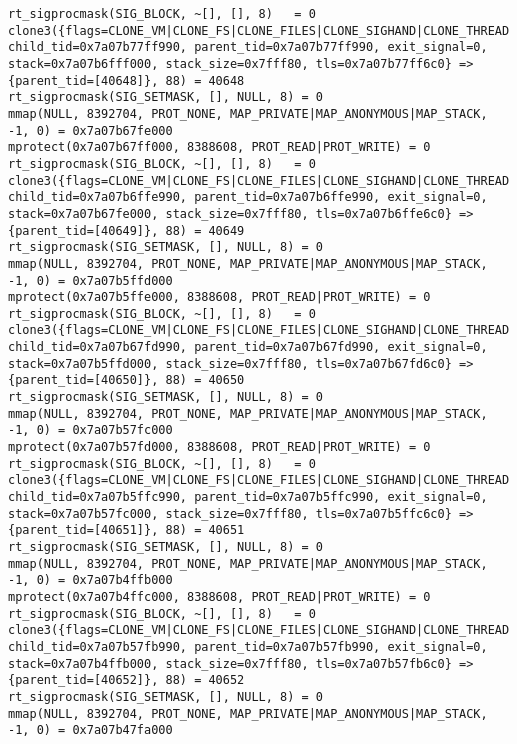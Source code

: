 \begin{verbatim}
rt_sigprocmask(SIG_BLOCK, ~[], [], 8)   = 0
clone3({flags=CLONE_VM|CLONE_FS|CLONE_FILES|CLONE_SIGHAND|CLONE_THREAD|CLONE_SYSVSEM|CLONE_SETTLS|CLONE_PARENT_SETTID|CLONE_CHILD_CLEARTID, child_tid=0x7a07b77ff990, parent_tid=0x7a07b77ff990, exit_signal=0, stack=0x7a07b6fff000, stack_size=0x7fff80, tls=0x7a07b77ff6c0} => {parent_tid=[40648]}, 88) = 40648
rt_sigprocmask(SIG_SETMASK, [], NULL, 8) = 0
mmap(NULL, 8392704, PROT_NONE, MAP_PRIVATE|MAP_ANONYMOUS|MAP_STACK, -1, 0) = 0x7a07b67fe000
mprotect(0x7a07b67ff000, 8388608, PROT_READ|PROT_WRITE) = 0
rt_sigprocmask(SIG_BLOCK, ~[], [], 8)   = 0
clone3({flags=CLONE_VM|CLONE_FS|CLONE_FILES|CLONE_SIGHAND|CLONE_THREAD|CLONE_SYSVSEM|CLONE_SETTLS|CLONE_PARENT_SETTID|CLONE_CHILD_CLEARTID, child_tid=0x7a07b6ffe990, parent_tid=0x7a07b6ffe990, exit_signal=0, stack=0x7a07b67fe000, stack_size=0x7fff80, tls=0x7a07b6ffe6c0} => {parent_tid=[40649]}, 88) = 40649
rt_sigprocmask(SIG_SETMASK, [], NULL, 8) = 0
mmap(NULL, 8392704, PROT_NONE, MAP_PRIVATE|MAP_ANONYMOUS|MAP_STACK, -1, 0) = 0x7a07b5ffd000
mprotect(0x7a07b5ffe000, 8388608, PROT_READ|PROT_WRITE) = 0
rt_sigprocmask(SIG_BLOCK, ~[], [], 8)   = 0
clone3({flags=CLONE_VM|CLONE_FS|CLONE_FILES|CLONE_SIGHAND|CLONE_THREAD|CLONE_SYSVSEM|CLONE_SETTLS|CLONE_PARENT_SETTID|CLONE_CHILD_CLEARTID, child_tid=0x7a07b67fd990, parent_tid=0x7a07b67fd990, exit_signal=0, stack=0x7a07b5ffd000, stack_size=0x7fff80, tls=0x7a07b67fd6c0} => {parent_tid=[40650]}, 88) = 40650
rt_sigprocmask(SIG_SETMASK, [], NULL, 8) = 0
mmap(NULL, 8392704, PROT_NONE, MAP_PRIVATE|MAP_ANONYMOUS|MAP_STACK, -1, 0) = 0x7a07b57fc000
mprotect(0x7a07b57fd000, 8388608, PROT_READ|PROT_WRITE) = 0
rt_sigprocmask(SIG_BLOCK, ~[], [], 8)   = 0
clone3({flags=CLONE_VM|CLONE_FS|CLONE_FILES|CLONE_SIGHAND|CLONE_THREAD|CLONE_SYSVSEM|CLONE_SETTLS|CLONE_PARENT_SETTID|CLONE_CHILD_CLEARTID, child_tid=0x7a07b5ffc990, parent_tid=0x7a07b5ffc990, exit_signal=0, stack=0x7a07b57fc000, stack_size=0x7fff80, tls=0x7a07b5ffc6c0} => {parent_tid=[40651]}, 88) = 40651
rt_sigprocmask(SIG_SETMASK, [], NULL, 8) = 0
mmap(NULL, 8392704, PROT_NONE, MAP_PRIVATE|MAP_ANONYMOUS|MAP_STACK, -1, 0) = 0x7a07b4ffb000
mprotect(0x7a07b4ffc000, 8388608, PROT_READ|PROT_WRITE) = 0
rt_sigprocmask(SIG_BLOCK, ~[], [], 8)   = 0
clone3({flags=CLONE_VM|CLONE_FS|CLONE_FILES|CLONE_SIGHAND|CLONE_THREAD|CLONE_SYSVSEM|CLONE_SETTLS|CLONE_PARENT_SETTID|CLONE_CHILD_CLEARTID, child_tid=0x7a07b57fb990, parent_tid=0x7a07b57fb990, exit_signal=0, stack=0x7a07b4ffb000, stack_size=0x7fff80, tls=0x7a07b57fb6c0} => {parent_tid=[40652]}, 88) = 40652
rt_sigprocmask(SIG_SETMASK, [], NULL, 8) = 0
mmap(NULL, 8392704, PROT_NONE, MAP_PRIVATE|MAP_ANONYMOUS|MAP_STACK, -1, 0) = 0x7a07b47fa000

\end{verbatim}

